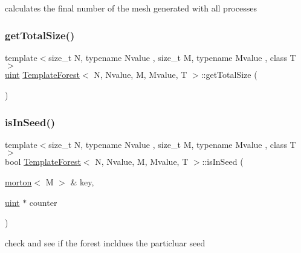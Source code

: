 calculates the final number of the mesh generated with all processes \mbox{\label{classTemplateForest_a43dbd821af1ed816be9ef782b6982c24}} 
\subsubsection{\texorpdfstring{get\+Total\+Size()}{getTotalSize()}}
{\footnotesize\ttfamily template$<$size\+\_\+t N, typename Nvalue , size\+\_\+t M, typename Mvalue , class T $>$ \\
\mbox{\hyperlink{definitions_8h_a69aa29b598b851b0640aa225a9e5d61d}{uint}} \mbox{\hyperlink{classTemplateForest}{Template\+Forest}}$<$ N, Nvalue, M, Mvalue, T $>$\+::get\+Total\+Size (\begin{DoxyParamCaption}{ }\end{DoxyParamCaption})}

\mbox{\label{classTemplateForest_aacf86db7e5c6a83890d0ae8c03c8ea84}} 
\subsubsection{\texorpdfstring{is\+In\+Seed()}{isInSeed()}}
{\footnotesize\ttfamily template$<$size\+\_\+t N, typename Nvalue , size\+\_\+t M, typename Mvalue , class T $>$ \\
bool \mbox{\hyperlink{classTemplateForest}{Template\+Forest}}$<$ N, Nvalue, M, Mvalue, T $>$\+::is\+In\+Seed (\begin{DoxyParamCaption}\item[{\mbox{\hyperlink{definitions_8h_af8682350bd8bb38ee9023f7a0a310add}{morton}}$<$ M $>$ \&}]{key,  }\item[{\mbox{\hyperlink{definitions_8h_a69aa29b598b851b0640aa225a9e5d61d}{uint}} $\ast$}]{counter }\end{DoxyParamCaption})}

check and see if the forest incldues the particluar seed \mbox{\label{classTemplateForest_a312fad17dc4021537c54119ab91fea87}} 
